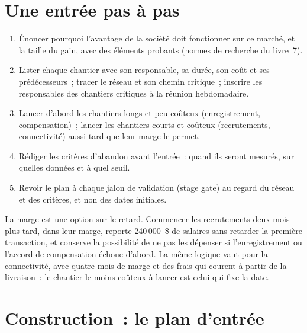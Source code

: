 \section{Une entrée pas à pas}

\begin{method}\label{met:fm:entering-a-new-market:plan}
\begin{enumerate}
\item Énoncer pourquoi l'avantage de la société doit fonctionner sur ce marché, et la taille du gain, avec des éléments probants (normes de recherche du livre~7).
\item Lister chaque chantier avec son responsable, sa durée, son coût et ses prédécesseurs~; tracer le réseau et son chemin critique~; inscrire les responsables des
chantiers critiques à la réunion hebdomadaire.
\item Lancer d'abord les chantiers longs et peu coûteux (enregistrement, compensation)~; lancer les chantiers courts et coûteux (recrutements, connectivité) aussi tard que
leur marge le permet.
\item Rédiger les critères d'abandon avant l'entrée~: quand ils seront mesurés, sur quelles données et à quel seuil.
\item Revoir le plan à chaque jalon de validation (stage gate) au regard du réseau et des critères, et non des dates initiales.
\end{enumerate}
\end{method}

\begin{remark}\label{rem:fm:entering-a-new-market:slack}
La marge est une option sur le retard. Commencer les recrutements deux mois plus tard, dans leur marge, reporte 240\,000~\$ de salaires sans retarder la première
transaction, et conserve la possibilité de ne pas les dépenser si l'enregistrement ou l'accord de compensation échoue d'abord. La même logique vaut pour la connectivité,
avec quatre mois de marge et des frais qui courent à partir de la livraison~: le chantier le moins coûteux à lancer est celui qui fixe la date.
\end{remark}

\section{Construction~: le plan d'entrée}\label{bld:fm:entering-a-new-market:entryplan}

